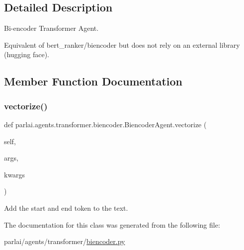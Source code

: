 \subsection{Detailed Description}
\begin{DoxyVerb}Bi-encoder Transformer Agent.

Equivalent of bert_ranker/biencoder but does not rely on an external library
(hugging face).
\end{DoxyVerb}
 

\subsection{Member Function Documentation}
\mbox{\label{classparlai_1_1agents_1_1transformer_1_1biencoder_1_1BiencoderAgent_a0a75b68e9e6877358245f85bcb438d03}} 
\subsubsection{\texorpdfstring{vectorize()}{vectorize()}}
{\footnotesize\ttfamily def parlai.\+agents.\+transformer.\+biencoder.\+Biencoder\+Agent.\+vectorize (\begin{DoxyParamCaption}\item[{}]{self,  }\item[{}]{args,  }\item[{}]{kwargs }\end{DoxyParamCaption})}

\begin{DoxyVerb}Add the start and end token to the text.
\end{DoxyVerb}
 

The documentation for this class was generated from the following file\+:\begin{DoxyCompactItemize}
\item 
parlai/agents/transformer/\hyperlink{biencoder_8py}{biencoder.\+py}\end{DoxyCompactItemize}

